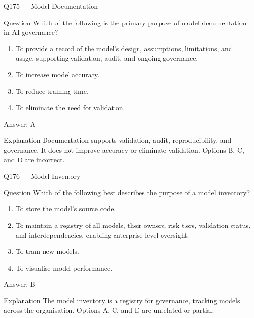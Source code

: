 \documentclass[aspectratio=169,8pt]{beamer}
\begin{document}
\begin{frame}{Q175 --- Model Documentation}
\begin{block}{Question}
Which of the following is the primary purpose of model documentation in AI governance?
\begin{enumerate}
\item To provide a record of the model's design, assumptions, limitations, and usage, supporting validation, audit, and ongoing governance.
\item To increase model accuracy.
\item To reduce training time.
\item To eliminate the need for validation.
\end{enumerate}  \end{block}
\begin{exampleblock}{Answer: A}\end{exampleblock}
\begin{block}{Explanation}
Documentation supports validation, audit, reproducibility, and governance. It does not improve accuracy or eliminate validation. Options B, C, and D are incorrect.
\end{block}
\end{frame}

\begin{frame}{Q176 --- Model Inventory}
\begin{block}{Question}
Which of the following best describes the purpose of a model inventory?
\begin{enumerate}
\item To store the model's source code.
\item To maintain a registry of all models, their owners, risk tiers, validation status, and interdependencies, enabling enterprise-level oversight.
\item To train new models.
\item To visualise model performance.
\end{enumerate}  \end{block}
\begin{exampleblock}{Answer: B}\end{exampleblock}
\begin{block}{Explanation}
The model inventory is a registry for governance, tracking models across the organisation. Options A, C, and D are unrelated or partial.
\end{block}
\end{frame}
\end{document}
